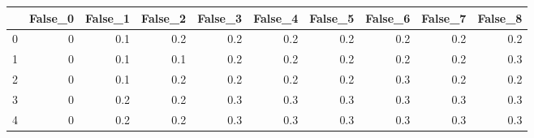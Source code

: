 \begin{tabular}{lrrrrrrrrr}
\toprule
{} &  False\_0 &  False\_1 &  False\_2 &  False\_3 &  False\_4 &  False\_5 &  False\_6 &  False\_7 &  False\_8 \\ \hline
\midrule
0 &        0 &      0.1 &      0.2 &      0.2 &      0.2 &      0.2 &      0.2 &      0.2 &      0.2 \\ \hline
1 &        0 &      0.1 &      0.1 &      0.2 &      0.2 &      0.2 &      0.2 &      0.2 &      0.3 \\ \hline
2 &        0 &      0.1 &      0.2 &      0.2 &      0.2 &      0.2 &      0.3 &      0.2 &      0.2 \\ \hline
3 &        0 &      0.2 &      0.2 &      0.3 &      0.3 &      0.3 &      0.3 &      0.3 &      0.3 \\ \hline
4 &        0 &      0.2 &      0.2 &      0.3 &      0.3 &      0.3 &      0.3 &      0.3 &      0.3 \\ \hline
\bottomrule
\end{tabular}
